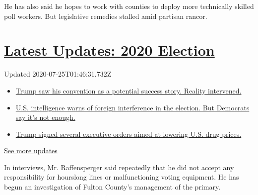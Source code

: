 He has also said he hopes to work with counties to deploy more
technically skilled poll workers. But legislative remedies stalled amid
partisan rancor.

\hypertarget{latest-updates-2020-election}{%
\section{\texorpdfstring{\href{https://www.nytimes3xbfgragh.onion/2020/07/24/us/elections/2020-presidential-election.html?action=click\&pgtype=Article\&state=default\&module=styln-elections-2020\&region=MAIN_CONTENT_1\&context=storylines_live_updates}{Latest
Updates: 2020
Election}}{Latest Updates: 2020 Election}}\label{latest-updates-2020-election}}

Updated 2020-07-25T01:46:31.732Z

\begin{itemize}
\tightlist
\item
  \href{https://www.nytimes3xbfgragh.onion/2020/07/24/us/elections/2020-presidential-election.html?action=click\&pgtype=Article\&state=default\&module=styln-elections-2020\&region=MAIN_CONTENT_1\&context=storylines_live_updates\#link-52155c51}{Trump
  saw his convention as a potential success story. Reality intervened.}
\item
  \href{https://www.nytimes3xbfgragh.onion/2020/07/24/us/elections/2020-presidential-election.html?action=click\&pgtype=Article\&state=default\&module=styln-elections-2020\&region=MAIN_CONTENT_1\&context=storylines_live_updates\#link-628390e8}{U.S.
  intelligence warns of foreign interference in the election. But
  Democrats say it's not enough.}
\item
  \href{https://www.nytimes3xbfgragh.onion/2020/07/24/us/elections/2020-presidential-election.html?action=click\&pgtype=Article\&state=default\&module=styln-elections-2020\&region=MAIN_CONTENT_1\&context=storylines_live_updates\#link-a66d253}{Trump
  signed several executive orders aimed at lowering U.S. drug prices.}
\end{itemize}

\href{https://www.nytimes3xbfgragh.onion/2020/07/24/us/elections/2020-presidential-election.html?action=click\&pgtype=Article\&state=default\&module=styln-elections-2020\&region=MAIN_CONTENT_1\&context=storylines_live_updates}{See
more updates}

In interviews, Mr. Raffensperger said repeatedly that he did not accept
any responsibility for hourslong lines or malfunctioning voting
equipment. He has begun an investigation of Fulton County's management
of the primary.

